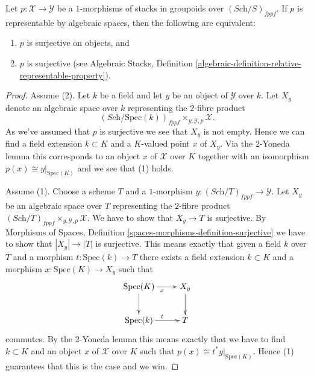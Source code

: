 \begin{lemma}
\label{lemma-representable-by-spaces-surjective}
Let $p : \mathcal{X} \to \mathcal{Y}$ be a $1$-morphisms of stacks in groupoids
over $(\textit{Sch}/S)_{fppf}$. If $p$ is
representable by algebraic spaces, then the following are equivalent:
\begin{enumerate}
\item $p$ is surjective on objects, and
\item $p$ is surjective (see
Algebraic Stacks,
Definition \ref{algebraic-definition-relative-representable-property}).
\end{enumerate}
\end{lemma}

\begin{proof}
Assume (2). Let $k$ be a field and let $y$ be an object of
$\mathcal{Y}$ over $k$. Let $X_y$ denote an algebraic space over $k$
representing the $2$-fibre product
$$
(\textit{Sch}/\text{Spec}(k))_{fppf} \times_{y, \mathcal{Y}, p} \mathcal{X}.
$$
As we've assumed that $p$ is surjective we see that $X_y$ is not empty.
Hence we can find a field extension $k \subset K$ and a $K$-valued point
$x$ of $X_y$. Via the $2$-Yoneda lemma this corresponds to an object
$x$ of $\mathcal{X}$ over $K$ together with an isomorphism
$p(x) \cong y|_{\text{Spec}(K)}$ and we see that (1) holds.

\medskip\noindent
Assume (1). Choose a scheme $T$ and a $1$-morphism
$y : (\textit{Sch}/T)_{fppf} \to \mathcal{Y}$. Let
$X_y$ be an algebraic space over $T$ representing the $2$-fibre product
$(\textit{Sch}/T)_{fppf} \times_{y, \mathcal{Y}, p} \mathcal{X}$.
We have to show that $X_y \to T$ is surjective. By
Morphisms of Spaces, Definition \ref{spaces-morphisms-definition-surjective}
we have to show that $|X_y| \to |T|$ is surjective.
This means exactly that given a field $k$ over $T$ and a
morphism $t : \text{Spec}(k) \to T$ there exists a field extension
$k \subset K$ and a morphism $x : \text{Spec}(K) \to X_y$ such that
$$
\xymatrix{
\text{Spec}(K) \ar[d] \ar[r]_x & X_y \ar[d] \\
\text{Spec}(k) \ar[r]^t & T
}
$$
commutes. By the $2$-Yoneda lemma this means exactly that we have to find
$k \subset K$ and an object $x$ of $\mathcal{X}$ over $K$ such that
$p(x) \cong t^*y|_{\text{Spec}(K)}$. Hence (1) guarantees that this is
the case and we win.
\end{proof}












